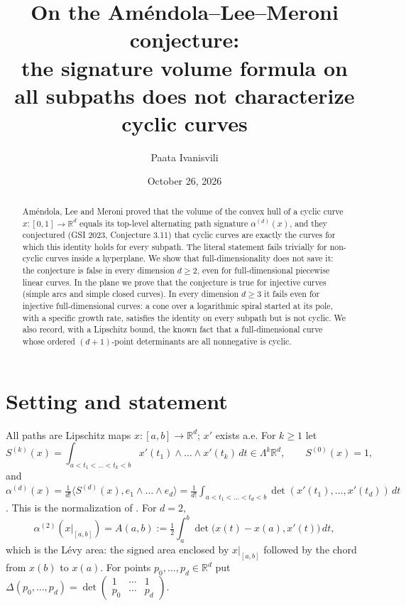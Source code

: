 \documentclass[11pt]{amsart}
\title[Signature volume formula and cyclic curves]{On the Am\'endola--Lee--Meroni conjecture:\\
the signature volume formula on all subpaths does not characterize cyclic curves}
\author{Paata Ivanisvili}
\date{October 26, 2026}
\theoremstyle{definition}
\newcommand{\R}{\mathbb{R}}
\begin{document}
\begin{abstract}
Am\'endola, Lee and Meroni proved that the volume of the convex hull of a cyclic curve
$x:[0,1]\to\R^d$ equals its top-level alternating path signature $\alpha^{(d)}(x)$, and they conjectured
(GSI 2023, Conjecture 3.11) that cyclic curves are exactly the curves for which this identity holds for every subpath.
The literal statement fails trivially for non-cyclic curves inside a hyperplane. We show that full-dimensionality does not save it: the conjecture is false in every
dimension $d\ge 2$, even for full-dimensional piecewise linear curves. In the plane we prove that the conjecture is true for injective curves (simple arcs and simple
closed curves). In every dimension $d\ge3$ it fails even for injective full-dimensional curves: a cone over a logarithmic spiral started at its pole,
with a specific growth rate, satisfies the identity on every subpath but is not cyclic. We also record, with a Lipschitz bound, the known fact that a
full-dimensional curve whose ordered $(d+1)$-point determinants are all nonnegative is cyclic.
\end{abstract}
\makeatletter
\let\aidisc@setabstracta\@setabstracta
\def\@setabstracta{\par\vskip 10pt{\centering\small\itshape
This proof was generated on October 27, 2026, by Grok Bot using Cursor’s agents, guided by several prompts from Paata Ivanisvili
\par}\aidisc@setabstracta}
\makeatother
\maketitle

\section{Setting and statement}

All paths are Lipschitz maps $x:[a,b]\to\R^d$; $x'$ exists a.e. For $k\ge1$ let
\[
S^{(k)}(x)=\int_{a<t_1<\dots<t_k<b} x'(t_1)\wedge\dots\wedge x'(t_k)\,dt\in\Lambda^k\R^d,\qquad S^{(0)}(x)=1,
\]
and $\alpha^{(d)}(x)=\frac1{d!}\langle S^{(d)}(x),e_1\wedge\dots\wedge e_d\rangle=\frac1{d!}\int_{a<t_1<\dots<t_d<b}\det(x'(t_1),\dots,x'(t_d))\,dt$.
This is the normalization of \cite{ALM}. For $d=2$,
\[
\alpha^{(2)}(x|_{[a,b]})=A(a,b):=\tfrac12\int_a^b\det\big(x(t)-x(a),x'(t)\big)\,dt,
\]
which is the L\'evy area: the signed area enclosed by $x|_{[a,b]}$ followed by the chord from $x(b)$ to $x(a)$.
For points $p_0,\dots,p_d\in\R^d$ put $\Delta(p_0,\dots,p_d)=\det\begin{pmatrix}1&\cdots&1\\ p_0&\cdots&p_d\end{pmatrix}$.
\end{document}
